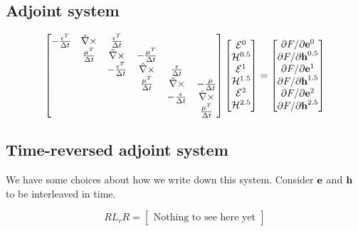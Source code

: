 \subsection{Adjoint system}
\begin{equation}
\begin{bmatrix}
-\frac{\epsilon^T}{\Delta t}  & \hat{\nabla} \times & \frac{\epsilon^T}{\Delta t} & & & \\
& \frac{\mu^T}{\Delta t} & \tilde{\nabla} \times & -\frac{\mu^T}{\Delta t} & & \\
& & -\frac{\epsilon^T}{\Delta t} & \hat{\nabla}\times & \frac{\epsilon}{\Delta t} & \\
& & & \frac{\mu^T}{\Delta t} & \tilde{\nabla} \times & -\frac{\mu}{\Delta t} \\
& & & & -\frac{\epsilon}{\Delta t} & \hat{\nabla} \times \\
& & & & & \frac{\mu^T}{\Delta t}
\end{bmatrix}
%
\begin{bmatrix}
\es{E}^0 \\ \es{H}^{0.5} \\ \es E^1 \\ \es H^{1.5} \\ \es E^2 \\ \es H^{2.5}
\end{bmatrix}
=
\begin{bmatrix}
\ppp{F}{\ve e^0} \\ \ppp{F}{\ve h^{0.5}} \\ \ppp{F}{\ve e^1} \\ \ppp{F}{\ve h^{1.5}} \\ \ppp{F}{\ve e^2} \\ \ppp{F}{\ve h^{2.5}}
\end{bmatrix}
\end{equation}

\subsection{Time-reversed adjoint system}

We have some choices about how we write down this system.  Consider $\textbf{e}$ and $\textbf{h}$ to be interleaved in time.

\begin{equation}
RL_rR =
\begin{bmatrix}
\textrm{Nothing to see here yet}
\end{bmatrix}
\end{equation}

